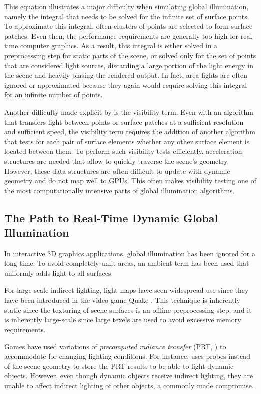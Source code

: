 This equation illustrates a major difficulty when simulating global illumination, namely the integral that needs to be solved for the infinite set of surface points. To approximate this integral, often clusters of points are selected to form surface patches. Even then, the performance requirements are generally too high for real-time computer graphics. As a result, this integral is either solved in a preprocessing step for static parts of the scene, or solved only for the set of points that are considered light sources, discarding a large portion of the light energy in the scene and heavily biasing the rendered output. In fact, area lights are often ignored or approximated because they again would require solving this integral for an infinite number of points.

Another difficulty made explicit by  is the visibility term. Even with an algorithm that transfers light between points or surface patches at a sufficient resolution and sufficient speed, the visibility term requires the addition of another algorithm that tests for each pair of surface elements whether any other surface element is located between them. To perform such visibility tests efficiently, acceleration structures are needed that allow to quickly traverse the scene's geometry. However, these data structures are often difficult to update with dynamic geometry and do not map well to GPUs. This often makes visibility testing one of the most computationally intensive parts of global illumination algorithms.




\subsection{The Path to Real-Time Dynamic Global Illumination}

In interactive 3D graphics applications, global illumination has been ignored for a long time. To avoid completely unlit areas, an ambient term has been used that uniformly adds light to all surfaces.

For large-scale indirect lighting, light maps have seen widespread use since they have been introduced in the video game Quake \citep{Abrash:1997:BlackBook}. This technique is inherently static since the texturing of scene surfaces is an offline preprocessing step, and it is inherently large-scale since large texels are used to avoid excessive memory requirements.

Games have used variations of \emph{precomputed radiance transfer} (PRT, \cite{sloan:2002:PRT}) to accommodate for changing lighting conditions. For instance, \citet{stefanov:2012:PRTinFarCry3} uses probes instead of the scene geometry to store the PRT results to be able to light dynamic objects. However, even though dynamic objects receive indirect lighting, they are unable to affect indirect lighting of other objects, a commonly made compromise.

